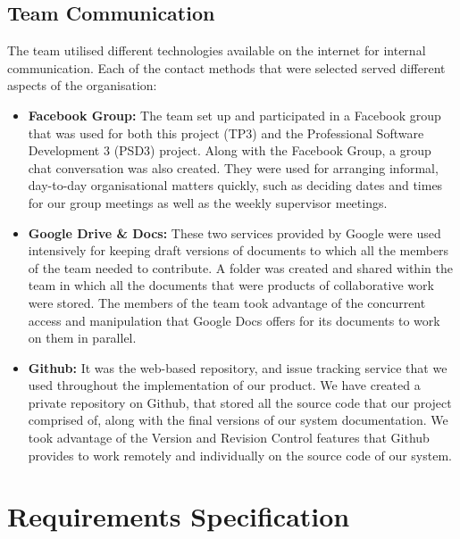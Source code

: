 \documentclass{l3proj}
\begin{document}
\section{Team Communication}
\par
The team utilised different technologies available on the internet for internal communication. Each of the contact methods that were selected served different aspects of the organisation:
\begin{itemize}
\item \textbf{Facebook Group:} The team set up and participated in a Facebook group that was used for both this project (TP3) and the Professional Software Development 3 (PSD3) project. Along with the Facebook Group, a group chat conversation was also created. They were used for arranging informal, day-to-day organisational matters quickly, such as deciding dates and times for our group meetings as well as the weekly supervisor meetings.
\item \textbf{Google Drive \& Docs:} These two services provided by Google were used intensively for keeping draft versions of documents to which all the members of the team needed to contribute. A folder was created and shared within the team in which all the documents that were products of collaborative work were stored. The members of the team took advantage of the concurrent access and manipulation that Google Docs offers for its documents to work on them in parallel.
\item \textbf{Github:} It was the web-based repository, and issue tracking service that we used throughout the implementation of our product. We have created a private repository on Github, that stored all the source code that our project comprised of, along with the final versions of our system documentation. We took advantage of the Version and Revision Control features that Github provides to work remotely and individually on the source code of our system.

\end{itemize}
\chapter{Requirements Specification}
\label{requirementsspecification}

\end{document}

